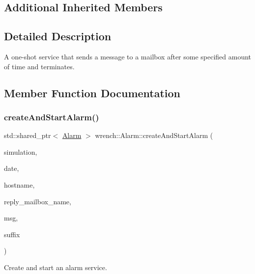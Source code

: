 \subsection*{Additional Inherited Members}


\subsection{Detailed Description}
A one-\/shot service that sends a message to a mailbox after some specified amount of time and terminates. 

\subsection{Member Function Documentation}
\mbox{\label{classwrench_1_1_alarm_aa786b7b67c563e7eea3d02ed4838fb9e}} 
\subsubsection{\texorpdfstring{create\+And\+Start\+Alarm()}{createAndStartAlarm()}}
{\footnotesize\ttfamily std\+::shared\+\_\+ptr$<$ \hyperlink{classwrench_1_1_alarm}{Alarm} $>$ wrench\+::\+Alarm\+::create\+And\+Start\+Alarm (\begin{DoxyParamCaption}\item[{\hyperlink{classwrench_1_1_simulation}{Simulation} $\ast$}]{simulation,  }\item[{double}]{date,  }\item[{std\+::string}]{hostname,  }\item[{std\+::string \&}]{reply\+\_\+mailbox\+\_\+name,  }\item[{\hyperlink{classwrench_1_1_simulation_message}{Simulation\+Message} $\ast$}]{msg,  }\item[{std\+::string}]{suffix }\end{DoxyParamCaption})\hspace{0.3cm}{\ttfamily [static]}}



Create and start an alarm service. 



